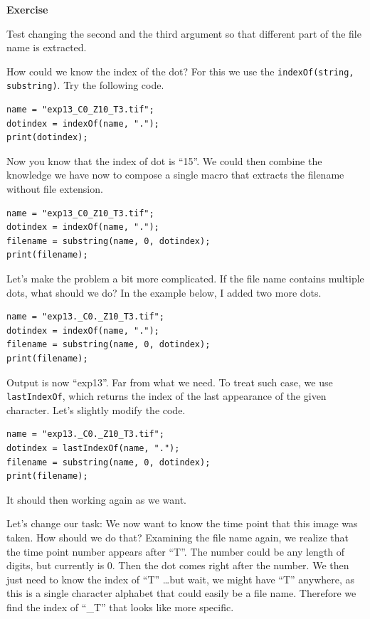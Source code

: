 \documentclass[11pt,a4paper,oneside]{report}
\newenvironment{indentexercise}[1]%
{{\setlength{\leftmargin}{2em}}%
\textbf{Exercise \thesubsection-#1}%
\begin{list}{}%
	\item%
}
{\end{list}}
\newcommand{\ilcom}[1]{\texttt{\small#1}}
\begin{document}
\begin{indentexercise}{1}
Test changing the second and the third argument so that different part of the file name is extracted. 
\end{indentexercise}

How could we know the index of the dot? For this we use the \ilcom{indexOf(string, substring)}. Try the following code. 

\begin{lstlisting}
name = "exp13_C0_Z10_T3.tif";
dotindex = indexOf(name, ".");
print(dotindex);
\end{lstlisting}

Now you know that the index of dot is ``15''. We could then combine the knowledge we have now to compose a single macro that extracts the filename without file extension. 

\begin{lstlisting}
name = "exp13_C0_Z10_T3.tif";
dotindex = indexOf(name, ".");
filename = substring(name, 0, dotindex);
print(filename);
\end{lstlisting}

Let's make the problem a bit more complicated. If the file name contains multiple dots, what should we do? In the example below, I added two more dots. 

\begin{lstlisting}
name = "exp13._C0._Z10_T3.tif";
dotindex = indexOf(name, ".");
filename = substring(name, 0, dotindex);
print(filename);
\end{lstlisting}

Output is now ``exp13''. Far from what we need. To treat such case, we use \ilcom{lastIndexOf}, which returns the index of the last appearance of the given character. Let's slightly modify the code. 

\begin{lstlisting}
name = "exp13._C0._Z10_T3.tif";
dotindex = lastIndexOf(name, ".");
filename = substring(name, 0, dotindex);
print(filename);
\end{lstlisting}

It should then working again as we want. 

Let's change our task: We now want to know the time point that this image was taken. How should we do that? Examining the file name again, we realize that the time point number appears after ``T''. The number could be any length of digits, but currently is 0. Then the dot comes right after the number. We then just need to know the index of ``T'' \ldots but wait, we might have ``T'' anywhere, as this is a single character alphabet that could easily be a file name. Therefore we find the index of ``\_T'' that looks like more specific. 
\end{document}
